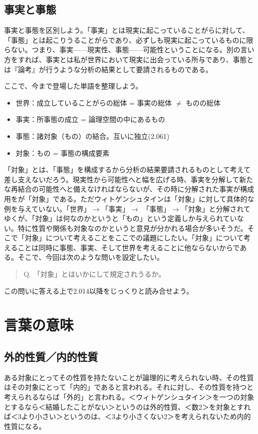 \documentclass[a4paper,11pt]{jsarticle}
\begin{document}
\subsection{事実と事態}
事実と事態を区別しよう。「事実」とは現実に起こっていることがらに対して、「事態」とは起こりうることがらであり、必ずしも現実に起こっているものに限らない。つまり、事実------現実性、事態------可能性ということになる。別の言い方をすれば、事実とは私が世界において現実に出会っている所与であり、事態とは『論考』が行うような分析の結果として要請されるものである。

ここで、今まで登場した単語を整理しよう。

\begin{itemize}
\item 世界：成立していることがらの総体 = 事実の総体 $\neq$ ものの総体
\item 事実：所事態の成立 = 論理空間の中にあるもの
\item 事態：諸対象（もの）の結合。互いに独立(2.061)
\item 対象：もの = 事態の構成要素

\end{itemize}

「対象」とは、「事態」を構成するから分析の結果要請されるものとして考えて差し支えないだろう。現実性から可能性へと幅を広げる時、事実を分解して新たな再結合の可能性へと備えなければならないが、その時に分解された事実が構成用をが「対象」である。ただウィトゲンシュタインは「対象」に対して具体的な例を与えていない。「世界」$\rightarrow$「事実」$\rightarrow$ 「事態」$\rightarrow$「対象」と分解されてゆくが、「対象」は何なのかというと「もの」という定義しか与えられていない。特に性質や関係も対象なのかというと意見が分かれる場合が多いそうだ。そこで「対象」について考えることをここでの議題にしたい。「対象」について考えることは同時に事態、事実、そして世界を考えることに他ならないからである。そこで、今回は次のような問いを設定したい。
\begin{quote}
Q. 「対象」とはいかにして規定されうるか。
\end{quote}
この問いに答える上で2.014以降をじっくりと読み合せよう。

\section{言葉の意味}
\subsection{外的性質／内的性質}
ある対象にとってその性質を持たないことが論理的に考えられない時、その性質はその対象にとって「内的」であると言われる。それに対し、その性質を持つと考えられるならば「外的」と言われる。＜ウィトゲンシュタイン＞を一つの対象とするなら＜結婚したことがない＞というのは外的性質、＜数2＞を対象とすれば＜3より小さい＞というのは、＜3より小さくない2＞を考えられないため内的性質になる。
\end{document}
